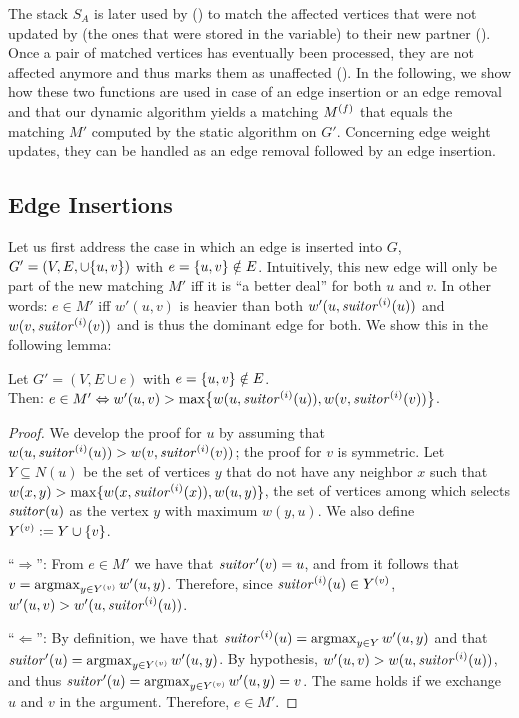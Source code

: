 The stack $S_A$ is later used by \updateaff ()
to match the affected vertices that were not updated by \findaff (\ie the ones
that were stored in the \cur variable) to their new partner
().
Once a pair of matched vertices has eventually been processed,
they are not affected anymore and thus \updateaff marks them as unaffected
().
In the following, we show how these two functions are used in case of an edge insertion
or an edge removal and that our dynamic algorithm yields a matching $M^{(f)}$
that equals the matching $M'$ computed by the static \suitor algorithm on $G'$.
Concerning edge weight updates, they can be handled as an edge removal followed
by an edge insertion.

\subsection{Edge Insertions}
\label{sec:dyn-mwm:single-insertions}
%
Let us first address the case in which an edge is inserted into $G$, \ie $G' =
(V, E, \cup \set{u, v})$ with $e = \set{u, v} \notin E$. Intuitively, this new
edge will only be part of the new matching $M'$ iff it is \enquote{a better
deal} for both $u$ and $v$. In other words: $e \in M'$ iff $w'(u, v)$ is
heavier than both $w'(u, \mathit{suitor}^{(i)}(u))$ and $w(v, \mathit{suitor}^{(i)}(v))$
and is thus the dominant edge for both. We show this in the following lemma:

\begin{lemma}
\label{lemma:dyn-mwm:affected-insertion}
Let $G' = (V, E\cup e)$ with $e = \set{u, v} \notin E$.\\
Then: $e\in M' \Leftrightarrow w'(u, v) > \max\set{w(u, \vsuitor\interm(u)), w(v, \vsuitor\interm(v))}$.
\end{lemma}

\begin{proof}
We develop the proof \wilog for $u$ by assuming that $w(u, \mathit{suitor}^{(i)}(u))
> w(v, \mathit{suitor}^{(i)}(v))$; the proof for $v$ is symmetric. Let $Y \subseteq
N(u)$ be the set of vertices $y$ that do not have any neighbor $x$ such that
$w(x, y) > \max\{w(x, \mathit{suitor}^{(i)}(x)), w(u, y)\}$, \ie the set of vertices
among which  selects $\mathit{suitor}(u)$ as the vertex $y$ with
maximum $w(y, u)$. We also define $Y^{(v)} := Y \cup \set{v}$.

\enquote{$\Rightarrow$}:
From $e\in M'$ we have that $\mathit{suitor}'(v) = u$, and from  it
follows that $v = \operatorname*{argmax}_{y \in Y^{(v)}}w'(u, y)$. Therefore, since
$\mathit{suitor}^{(i)}(u) \in Y^{(v)}$, $w'(u, v) > w'(u, \mathit{suitor}^{(i)}(u))$.

\enquote{$\Leftarrow$}:
By definition, we have that $\mathit{suitor}^{(i)}(u) = \operatorname*{argmax}_{y \in Y}w'(u, y)$
and that $\mathit{suitor}'(u) = \operatorname*{argmax}_{y \in Y^{(v)}}w'(u, y)$. By hypothesis,
$w'(u, v) > w(u, \mathit{suitor}^{(i)}(u))$, and thus $\mathit{suitor}'(u) = \operatorname*{argmax}_{y \in
Y^{(v)}}w'(u, y) = v$. The same holds if we exchange $u$ and $v$ in the
argument. Therefore, $e \in M'$.
\end{proof}

